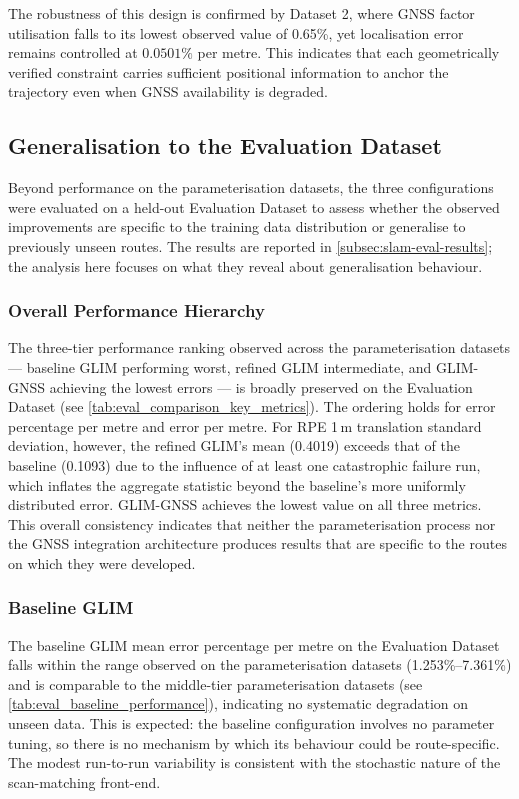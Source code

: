 The robustness of this design is confirmed by Dataset 2, where GNSS factor utilisation falls to its lowest observed value of 0.65\%, yet localisation error remains controlled at $0.0501\%$ per metre. This indicates that each geometrically verified constraint carries sufficient positional information to anchor the trajectory even when GNSS availability is degraded.

\subsection{Generalisation to the Evaluation Dataset}
\label{subsec:slam-generalisation}

Beyond performance on the parameterisation datasets, the three configurations were evaluated on a held-out Evaluation Dataset to assess whether the observed improvements are specific to the training data distribution or generalise to previously unseen routes. The results are reported in \cref{subsec:slam-eval-results}; the analysis here focuses on what they reveal about generalisation behaviour.

\subsubsection{Overall Performance Hierarchy}

The three-tier performance ranking observed across the parameterisation datasets — baseline GLIM performing worst, refined GLIM intermediate, and GLIM-GNSS achieving the lowest errors — is broadly preserved on the Evaluation Dataset (see \cref{tab:eval_comparison_key_metrics}). The ordering holds for error percentage per metre and error per metre. For RPE 1\,m translation standard deviation, however, the refined GLIM's mean (0.4019) exceeds that of the baseline (0.1093) due to the influence of at least one catastrophic failure run, which inflates the aggregate statistic beyond the baseline's more uniformly distributed error. GLIM-GNSS achieves the lowest value on all three metrics. This overall consistency indicates that neither the parameterisation process nor the GNSS integration architecture produces results that are specific to the routes on which they were developed.

\subsubsection{Baseline GLIM}

The baseline GLIM mean error percentage per metre on the Evaluation Dataset falls within the range observed on the parameterisation datasets (1.253\%--7.361\%) and is comparable to the middle-tier parameterisation datasets (see \cref{tab:eval_baseline_performance}), indicating no systematic degradation on unseen data. This is expected: the baseline configuration involves no parameter tuning, so there is no mechanism by which its behaviour could be route-specific. The modest run-to-run variability is consistent with the stochastic nature of the scan-matching front-end.

